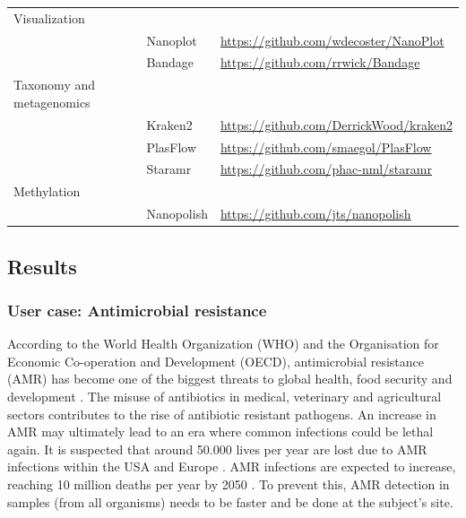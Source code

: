 \documentclass[a4paper,num-refs]{oup-contemporary}
\begin{document}
\begin{table}[b!]
\begin{tabularx}{\linewidth}{l l l}
Visualization                   &            &                                               \\
                                & Nanoplot   & \url{https://github.com/wdecoster/NanoPlot}   \\
                                & Bandage    & \url{https://github.com/rrwick/Bandage}       \\
Taxonomy and metagenomics       &            &                                               \\
                                & Kraken2    & \url{https://github.com/DerrickWood/kraken2}  \\
                                & PlasFlow   & \url{https://github.com/smaegol/PlasFlow}     \\
                                & Staramr    & \url{https://github.com/phac-nml/staramr}     \\
Methylation                     &            &                                               \\
                                & Nanopolish & \url{https://github.com/jts/nanopolish}       \\
\bottomrule
\end{tabularx}
\end{table}


\subsection{Results}
\subsubsection{User case: Antimicrobial resistance}
According to the World Health Organization (WHO) and the Organisation for Economic Co-operation and Development (OECD), antimicrobial resistance (AMR) has become one of the biggest threats to global health, food security and development \cite{OrganisationforEconomicCo-operationandDevelopment2017, WorldHealthOrganization2018}. The misuse of antibiotics in medical, veterinary and agricultural sectors contributes to the rise of antibiotic resistant pathogens. An increase in AMR may ultimately lead to an era where common infections could be lethal again. It is suspected that around 50.000 lives per year are lost due to AMR infections within the USA and Europe \cite{Simlai2016}. AMR infections are expected to increase, reaching 10 million deaths per year by 2050 \cite{ONeil2014}. To prevent this, AMR detection in samples (from all organisms) needs to be faster and be done at the subject's site.
\end{document}
